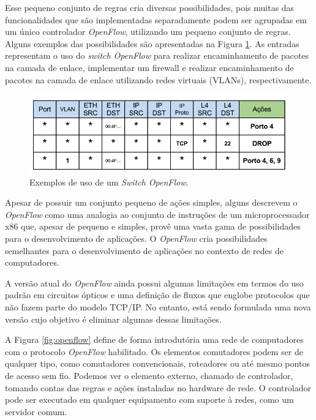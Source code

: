 Esse pequeno conjunto de regras cria diversas possibilidades,
pois muitas das funcionalidades que são implementadas 
separadamente podem ser agrupadas em um único controlador
\textit{OpenFlow}, utilizando um pequeno conjunto de regras. Alguns 
exemplos das possibilidades são apresentadas na Figura \ref{fig:exemploSwitchOpenFlow}.
As entradas representam o uso do \textit{switch} \textit{OpenFlow}
para realizar encaminhamento de pacotes na camada de enlace,
implementar um firewall e realizar encaminhamento de pacotes 
na camada de enlace utilizando redes virtuais (VLANs), respectivamente.

\begin{figure}[h] \centering
\includegraphics[width=160mm]{exemploSwitchOpenFlow.png} 
\caption{Exemplos de uso de um \textit{Switch OpenFlow}.} 
\label{fig:exemploSwitchOpenFlow} 
\end{figure}

Apesar de possuir um conjunto pequeno de ações simples, 
alguns descrevem o \textit{OpenFlow} como uma analogia ao conjunto 
de instruções de um microprocessador x86 que, apesar de 
pequeno e simples, provê uma vasta gama de possibilidades 
para o desenvolvimento de aplicações. O \textit{OpenFlow} cria 
possibilidades semelhantes para o desenvolvimento de 
aplicações no contexto de redes de computadores. 

A versão atual do \textit{OpenFlow} ainda possui algumas limitações
em termos do uso padrão em circuitos ópticos e uma definição 
de fluxos que englobe protocolos que não fazem parte do 
modelo TCP/IP. No entanto, está sendo formulada uma nova
versão cujo objetivo é eliminar algumas dessas limitações.

A Figura \ref{fig:openflow} define de forma introdutória uma 
rede de computadores com o protocolo \textit{OpenFlow} habilitado. Os 
elementos comutadores podem ser de qualquer tipo, como 
comutadores convencionais, roteadores ou até mesmo pontos
de acesso sem fio. Podemos ver o elemento externo, chamado
de controlador, tomando contas das regras e ações instaladas
no hardware de rede. O controlador pode ser executado em 
qualquer equipamento com suporte à redes, como um 
servidor comum.

